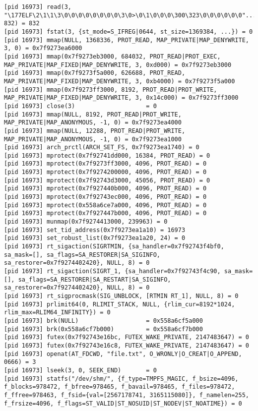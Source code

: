 \documentclass[a4paper, 12pt]{article}
\begin{document}
\begin{lstlisting}
[pid 16973] read(3, "\177ELF\2\1\1\3\0\0\0\0\0\0\0\0\3\0>\0\1\0\0\0\300\323\0\0\0\0\0\0"..., 832) = 832
[pid 16973] fstat(3, {st_mode=S_IFREG|0644, st_size=1369384, ...}) = 0
[pid 16973] mmap(NULL, 1368336, PROT_READ, MAP_PRIVATE|MAP_DENYWRITE, 3, 0) = 0x7f9273ea6000
[pid 16973] mmap(0x7f9273eb3000, 684032, PROT_READ|PROT_EXEC, MAP_PRIVATE|MAP_FIXED|MAP_DENYWRITE, 3, 0xd000) = 0x7f9273eb3000
[pid 16973] mmap(0x7f9273f5a000, 626688, PROT_READ, MAP_PRIVATE|MAP_FIXED|MAP_DENYWRITE, 3, 0xb4000) = 0x7f9273f5a000
[pid 16973] mmap(0x7f9273ff3000, 8192, PROT_READ|PROT_WRITE, MAP_PRIVATE|MAP_FIXED|MAP_DENYWRITE, 3, 0x14c000) = 0x7f9273ff3000
[pid 16973] close(3)                    = 0
[pid 16973] mmap(NULL, 8192, PROT_READ|PROT_WRITE, MAP_PRIVATE|MAP_ANONYMOUS, -1, 0) = 0x7f9273ea4000
[pid 16973] mmap(NULL, 12288, PROT_READ|PROT_WRITE, MAP_PRIVATE|MAP_ANONYMOUS, -1, 0) = 0x7f9273ea1000
[pid 16973] arch_prctl(ARCH_SET_FS, 0x7f9273ea1740) = 0
[pid 16973] mprotect(0x7f92741dd000, 16384, PROT_READ) = 0
[pid 16973] mprotect(0x7f9273ff3000, 4096, PROT_READ) = 0
[pid 16973] mprotect(0x7f9274200000, 4096, PROT_READ) = 0
[pid 16973] mprotect(0x7f92743d3000, 45056, PROT_READ) = 0
[pid 16973] mprotect(0x7f927440b000, 4096, PROT_READ) = 0
[pid 16973] mprotect(0x7f92743ec000, 4096, PROT_READ) = 0
[pid 16973] mprotect(0x558a6ce7a000, 4096, PROT_READ) = 0
[pid 16973] mprotect(0x7f927447b000, 4096, PROT_READ) = 0
[pid 16973] munmap(0x7f9274413000, 239963) = 0
[pid 16973] set_tid_address(0x7f9273ea1a10) = 16973
[pid 16973] set_robust_list(0x7f9273ea1a20, 24) = 0
[pid 16973] rt_sigaction(SIGRTMIN, {sa_handler=0x7f92743f4bf0, sa_mask=[], sa_flags=SA_RESTORER|SA_SIGINFO, sa_restorer=0x7f9274402420}, NULL, 8) = 0
[pid 16973] rt_sigaction(SIGRT_1, {sa_handler=0x7f92743f4c90, sa_mask=[], sa_flags=SA_RESTORER|SA_RESTART|SA_SIGINFO, sa_restorer=0x7f9274402420}, NULL, 8) = 0
[pid 16973] rt_sigprocmask(SIG_UNBLOCK, [RTMIN RT_1], NULL, 8) = 0
[pid 16973] prlimit64(0, RLIMIT_STACK, NULL, {rlim_cur=8192*1024, rlim_max=RLIM64_INFINITY}) = 0
[pid 16973] brk(NULL)                   = 0x558a6cf5a000
[pid 16973] brk(0x558a6cf7b000)         = 0x558a6cf7b000
[pid 16973] futex(0x7f92743e16bc, FUTEX_WAKE_PRIVATE, 2147483647) = 0
[pid 16973] futex(0x7f92743e16c8, FUTEX_WAKE_PRIVATE, 2147483647) = 0
[pid 16973] openat(AT_FDCWD, "file.txt", O_WRONLY|O_CREAT|O_APPEND, 0666) = 3
[pid 16973] lseek(3, 0, SEEK_END)       = 0
[pid 16973] statfs("/dev/shm/", {f_type=TMPFS_MAGIC, f_bsize=4096, f_blocks=978472, f_bfree=978465, f_bavail=978465, f_files=978472, f_ffree=978463, f_fsid={val=[2567178741, 3165115080]}, f_namelen=255, f_frsize=4096, f_flags=ST_VALID|ST_NOSUID|ST_NODEV|ST_NOATIME}) = 0

\end{lstlisting}
\end{document}
